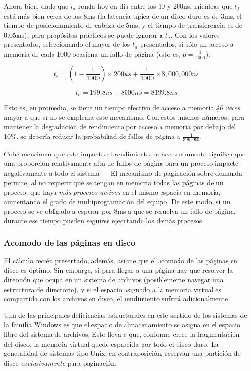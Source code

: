 \documentclass[11pt,fleqn]{book} %
\begin{document}
Ahora bien, dado que $t_a$ ronda hoy en día entre los 10 y 200ns,
mientras que $t_f$ está más bien cerca de los 8ms (la latencia típica
de un disco duro es de 3ms, el tiempo de posicionamiento de cabeza de
5ms, y el tiempo de transferencia es de 0.05ms), para propósitos
prácticos se puede ignorar a $t_a$. Con los valores presentados, seleccionando
el mayor de los $t_a$ presentados, si sólo un acceso a memoria de cada
1000 ocasiona un fallo de página (esto es, $p=\frac{1}{1000}$):

$$t_e = (1-\frac{1}{1000}) \times 200ns + \frac{1}{1000} \times 8,000,000ns$$

$$t_e = 199.8ns + 8000ns = 8199.8ns$$

Esto es, en promedio, se tiene un tiempo efectivo de acceso a memoria
\emph{40 veces} mayor a que si no se empleara este mecanismo. Con estos
mismos números, para mantener la degradación de rendimiento por acceso
a memoria por debajo del 10\%, se debería reducir la probabiliad de
fallos de página a $\frac{1}{399,990}$.

Cabe mencionar que este impacto al rendimiento no necesariamente
significa que una proporción relativamente alta de fallos de página
para un proceso impacte negativamente a todo el sistema — El mecanismo
de paginación sobre demanda permite, al no requerir que se tengan en
memoria todas las páginas de un proceso, que haya \emph{más procesos activos} en el mismo espacio en memoria, aumentando el grado de
multiprogramación del equipo. De este modo, si un proceso se ve
obligado a esperar por 8ms a que se resuelva un fallo de página,
durante ese tiempo pueden seguirse ejecutando los demás procesos.
\subsubsection{Acomodo de las páginas en disco}
\label{sec-5-5-2-1}
\label{MEM_acomodo_de_paginas}

El cálculo recién presentado, además, asume que el acomodo de las
páginas en disco es óptimo. Sin embargo, si para llegar a una página
hay que resolver la dirección que ocupa en un sistema de archivos
(posiblemente navegar una estructura de directorio), y si el espacio
asignado a la memoria virtual es compartido con los archivos en disco,
el rendimiento sufrirá adicionalmente.

Una de las principales deficiencias estructurales en este sentido de
los sistemas de la familia Windows es que el espacio de almacenamiento
se asigna en el espacio libre del sistema de archivos. Esto lleva a
que, conforme crece la fragmentación del disco, la memoria virtual
quede esparcida por todo el disco duro. La generalidad de sistemas tipo 
Unix, en contraposición, reservan una partición de disco \emph{exclusivamente} 
para paginación.
\end{document}
